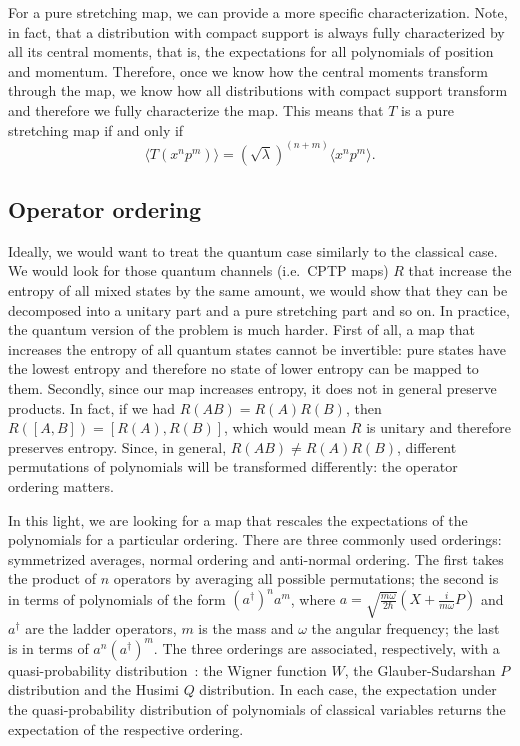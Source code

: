 \documentclass{SciPost}
\begin{document}
For a pure stretching map, we can provide a more specific characterization. Note, in fact, that a distribution with compact support is always fully characterized by all its central moments, that is, the expectations for all polynomials of position and momentum. Therefore, once we know how the central moments transform through the map, we know how all distributions with compact support transform and therefore we fully characterize the map. This means that $T$ is a pure stretching map if and only if
\begin{equation}
	\langle T(x^np^m) \rangle = (\sqrt{\lambda})^{(n+m)} \langle x^n p^m \rangle.
\end{equation}

\subsection{Operator ordering}

Ideally, we would want to treat the quantum case similarly to the classical case. We would look for those quantum channels (i.e.~CPTP maps) $R$ that increase the entropy of all mixed states by the same amount, we would show that they can be decomposed into a unitary part and a pure stretching part and so on. In practice, the quantum version of the problem is much harder. First of all, a map that increases the entropy of all quantum states cannot be invertible: pure states have the lowest entropy and therefore no state of lower entropy can be mapped to them. Secondly, since our map increases entropy, it does not in general preserve products. In fact, if we had $R(AB) = R(A)R(B)$, then $R([A,B]) = [R(A),R(B)]$, which would mean $R$ is unitary and therefore preserves entropy. Since, in general, $R(AB) \neq R(A)R(B)$, different permutations of polynomials will be transformed differently: the operator ordering matters.

In this light, we are looking for a map that rescales the expectations of the polynomials for a particular ordering. There are three commonly used orderings: symmetrized averages, normal ordering and anti-normal ordering. The first takes the product of $n$ operators by averaging all possible permutations; the second is in terms of polynomials of the form $(a^\dagger)^n a^m$, where $a=\sqrt{\frac{m\omega}{2\hbar}}(X+\frac{i}{m\omega}P)$ and $a^\dagger$ are the ladder operators, $m$ is the mass and $\omega$ the angular frequency; the last is in terms of $a^n (a^\dagger)^m$. The three orderings are associated, respectively, with a quasi-probability distribution~\cite{carmichael2013statistical}: the Wigner function $W$, the Glauber-Sudarshan $P$ distribution and the Husimi $Q$ distribution. In each case, the expectation under the quasi-probability distribution of polynomials of classical variables returns the expectation of the respective ordering.
\end{document}
